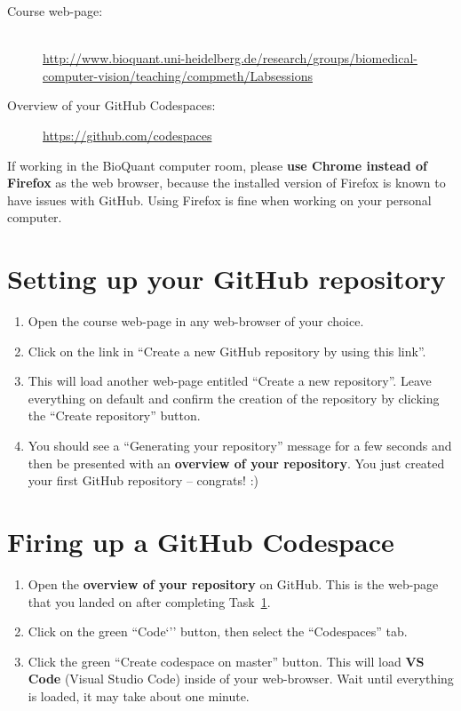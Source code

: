 \documentclass[12pt,a4paper]{article}
\begin{document}
\begin{sloppypar}
\begin{description}
\item[Course web-page:]~\\\url{http://www.bioquant.uni-heidelberg.de/research/groups/biomedical-computer-vision/teaching/compmeth/Labsessions}
\item[Overview of your GitHub Codespaces:] \url{https://github.com/codespaces}
\end{description}
\end{sloppypar}

If working in the BioQuant computer room, please \textbf{use Chrome instead of Firefox} as the web browser, because the installed version of Firefox is known to have issues with GitHub. Using Firefox is fine when working on your personal computer.

\section{Setting up your GitHub repository}
\label{task:preparation}
\begin{enumerate}
\item Open the course web-page in any web-browser of your choice.
\item Click on the link in ``Create a new GitHub repository by using this link''.
\item This will load another web-page entitled ``Create a new repository''. Leave everything on default and confirm the creation of the repository by clicking the ``Create repository'' button.
\item You should see a ``Generating your repository'' message for a few seconds and then be presented with an \textbf{overview of your repository}. You just created your first GitHub repository -- congrats! :)
\end{enumerate}

\section{Firing up a GitHub Codespace}
\label{task:codespaces}
\begin{enumerate}
\item Open the \textbf{overview of your repository} on GitHub. This is the web-page that you landed on after completing Task~\ref{task:preparation}.
\item Click on the green ``Code`'' button, then select the ``Codespaces'' tab.
\item Click the green ``Create codespace on master'' button. This will load \textbf{VS Code} (Visual Studio Code) inside of your web-browser. Wait until everything is loaded, it may take about one minute.
\end{enumerate}
\end{document}
